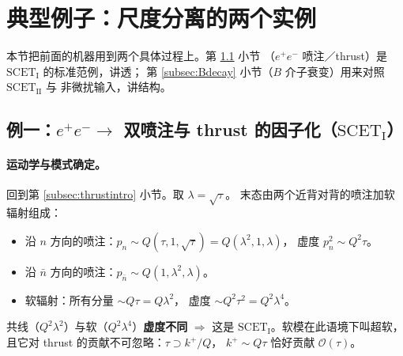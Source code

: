 \documentclass[UTF8,a4paper,11pt]{ctexart}
\theoremstyle{definition}
\theoremstyle{remark}
\theoremstyle{plain}
\newcommand{\SCETI}{\text{SCET}_{\mathrm{I}}}
\newcommand{\SCETII}{\text{SCET}_{\mathrm{II}}}
\begin{document}
\section{典型例子：尺度分离的两个实例}
\label{sec:examples}

本节把前面的机器用到两个具体过程上。第 \ref{subsec:thrustfull} 小节
（$e^+e^-$ 喷注／thrust）是 $\SCETI$ 的标准范例，讲透；
第 \ref{subsec:Bdecay} 小节（$B$ 介子衰变）用来对照 $\SCETII$ 与
非微扰输入，讲结构。

\subsection{例一：$e^+e^-\to$ 双喷注与 thrust 的因子化（$\SCETI$）}
\label{subsec:thrustfull}

\paragraph{运动学与模式确定。}
回到第 \ref{subsec:thrustintro} 小节。取 $\lambda=\sqrt\tau$。
末态由两个近背对背的喷注加软辐射组成：

\begin{itemize}
  \item 沿 $n$ 方向的喷注：$p_n\sim Q(\tau,1,\sqrt\tau)=Q(\lambda^2,1,\lambda)$，
        虚度 $p_n^2\sim Q^2\tau$。
  \item 沿 $\bar n$ 方向的喷注：$p_{\bar n}\sim Q(1,\lambda^2,\lambda)$。
  \item 软辐射：所有分量 $\sim Q\tau=Q\lambda^2$，
        虚度 $\sim Q^2\tau^2=Q^2\lambda^4$。
\end{itemize}

共线（$Q^2\lambda^2$）与软（$Q^2\lambda^4$）\textbf{虚度不同}
$\Longrightarrow$ 这是 $\SCETI$。软模在此语境下叫超软，
且它对 thrust 的贡献不可忽略：$\tau\supset k^+/Q$，
$k^+\sim Q\tau$ 恰好贡献 $\mathcal O(\tau)$。
\end{document}
